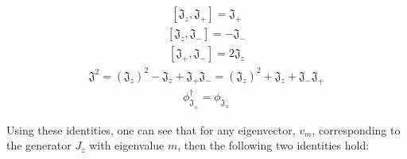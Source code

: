 \begin{equation}
	\begin{aligned}
		[\mathfrak{J}_z,\mathfrak{J}_+] = \mathfrak{J}_+
	\end{aligned}
\end{equation} 
\begin{equation}
	\begin{aligned}
		[\mathfrak{J}_z,\mathfrak{J}_-] = -\mathfrak{J}_-
	\end{aligned}
\end{equation} 
\begin{equation}
	\begin{aligned}
		[\mathfrak{J}_+,\mathfrak{J}_-] = 2\mathfrak{J}_z
	\end{aligned}
\end{equation} 
\begin{equation}
	\begin{aligned}
		\mathfrak{J}^2 = (\mathfrak{J}_z)^2  -\mathfrak{J}_z +\mathfrak{J}_+\mathfrak{J}_- = (\mathfrak{J}_z)^2 +\mathfrak{J}_z+ \mathfrak{J}_-\mathfrak{J}_+
	\end{aligned}
\end{equation} 
\begin{equation}
	\begin{aligned}
		\phi_{\mathfrak{J}_\pm}^\dag = \phi_{\mathfrak{J}_\mp}
	\end{aligned}
\end{equation} 

Using these identities, one can see that for any eigenvector, $v_m$, corresponding to the generator $J_z$ with eigenvalue $m$, then the following two identities hold:

